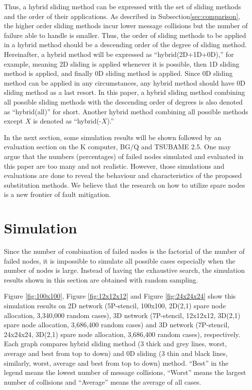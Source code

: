 \documentclass[Afour,times,sagev]{sagej}
\begin{document}
Thus, a hybrid sliding method can be expressed with the set of sliding 
methods and the order of their applications. As described in
Subsection\ref{sec:comparison}, the higher order sliding methods incur
lower message collisions but the number of failure able to
handle is smaller. Thus, the order of sliding methods to be applied in
a hybrid method should be a descending order of the degree of sliding
method. Hereinafter, a hybrid method will be expressed as
``hybrid(2D+1D+0D),'' for example, meaning 2D sliding is applied
whenever it is possible, then 1D sliding method is applied, and
finally 0D sliding method is applied. Since 0D sliding method can be
applied in any circumstances, any hybrid method should have 0D sliding  
method as a last resort. In this paper, a hybrid sliding method
combining all possible sliding methods with the descending order of
degrees is also denoted as ``hybrid(all)'' for short. Another hybrid
method combining all possible methods except $X$ is denoted as
``hybrid(-$X$).''  

In the next section, some simulation results will be shown followed by
an evaluation section on the K computer, BG/Q and TSUBAME
2.5\cite{tsubame}. One may 
argue that the numbers (percentages) of failed nodes simulated and
evaluated in this paper are too many and not realistic. However,
those simulations and evaluations are done to reveal the behaviour and 
characteristics of the proposed substitution methods. We believe that
the research on how to utilize spare nodes is a new frontier of fault
mitigation. 

\section{Simulation}\label{sec:sim}

Since the number of combination of failed nodes is the factorial of
the number of failed nodes, it is impossible to simulate all possible
cases especially when the number of nodes is large. Instead of having
the exhaustive search, the simulation results shown in this section
are obtained with random sampling. 

Figure \ref{fig:100x100}, Figure \ref{fig:12x12x12} and
Figure \ref{fig:24x24x24} show this simulation results on 2D network
(5P-stencil, 100x100, 2D(2,1) spare node allocation, 3,340,000 random
cases), 3D network (7P-stencil, 12x12x12, 3D(2,1) spare node
allocation, 3,686,400 random cases) and 3D network (7P-stencil,
24x24x24, 3D(2,1) spare node allocation, 3,686,400 random cases),
respectively. Each graph compares hybrid sliding method (3 thick and
grey lines, worst, average and best from top to down) and 0D
sliding (3 thin and black lines, similarly, worst, average and best
from top to down) method. ``Best'' in the legend means the lowest
number of message collisions, ``Worst'' means the largest number of
collisions and ``Average'' means the average of all cases. 
\end{document}

